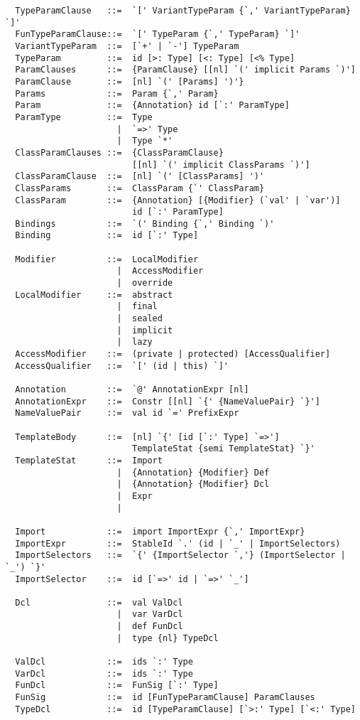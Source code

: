 {\begin{lstlisting}
  TypeParamClause   ::=  `[' VariantTypeParam {`,' VariantTypeParam} `]'
  FunTypeParamClause::=  `[' TypeParam {`,' TypeParam} `]'
  VariantTypeParam  ::=  [`+' | `-'] TypeParam
  TypeParam         ::=  id [>: Type] [<: Type] [<% Type]
  ParamClauses      ::=  {ParamClause} [[nl] `(' implicit Params `)']
  ParamClause       ::=  [nl] `(' [Params] ')'} 
  Params            ::=  Param {`,' Param}
  Param             ::=  {Annotation} id [`:' ParamType]
  ParamType         ::=  Type 
                      |  `=>' Type 
                      |  Type `*'
  ClassParamClauses ::=  {ClassParamClause} 
                         [[nl] `(' implicit ClassParams `)']
  ClassParamClause  ::=  [nl] `(' [ClassParams] ')'
  ClassParams       ::=  ClassParam {`' ClassParam}
  ClassParam        ::=  {Annotation} [{Modifier} (`val' | `var')] 
                         id [`:' ParamType]
  Bindings          ::=  `(' Binding {`,' Binding `)'
  Binding           ::=  id [`:' Type]

  Modifier          ::=  LocalModifier 
                      |  AccessModifier
                      |  override
  LocalModifier     ::=  abstract
                      |  final
                      |  sealed
                      |  implicit
                      |  lazy
  AccessModifier    ::=  (private | protected) [AccessQualifier]
  AccessQualifier   ::=  `[' (id | this) `]'

  Annotation        ::=  `@' AnnotationExpr [nl]
  AnnotationExpr    ::=  Constr [[nl] `{' {NameValuePair} `}']
  NameValuePair     ::=  val id `=' PrefixExpr

  TemplateBody      ::=  [nl] `{' [id [`:' Type] `=>'] 
                         TemplateStat {semi TemplateStat} `}'
  TemplateStat      ::=  Import
                      |  {Annotation} {Modifier} Def
                      |  {Annotation} {Modifier} Dcl
                      |  Expr
                      |

  Import            ::=  import ImportExpr {`,' ImportExpr}
  ImportExpr        ::=  StableId `.' (id | `_' | ImportSelectors)
  ImportSelectors   ::=  `{' {ImportSelector `,'} (ImportSelector | `_') `}'
  ImportSelector    ::=  id [`=>' id | `=>' `_']

  Dcl               ::=  val ValDcl
                      |  var VarDcl
                      |  def FunDcl
                      |  type {nl} TypeDcl

  ValDcl            ::=  ids `:' Type
  VarDcl            ::=  ids `:' Type
  FunDcl            ::=  FunSig [`:' Type]
  FunSig            ::=  id [FunTypeParamClause] ParamClauses
  TypeDcl           ::=  id [TypeParamClause] [`>:' Type] [`<:' Type]


\end{lstlisting}}
